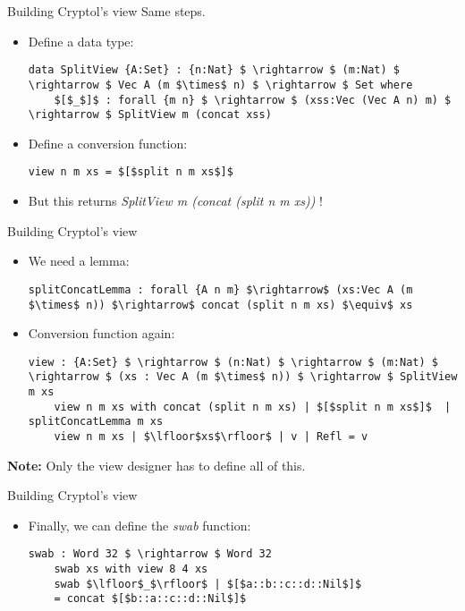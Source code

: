 \documentclass[10pt]{beamer}
\begin{document}
\begin{frame}[fragile]{Building Cryptol's view}
Same steps.
\begin{itemize}
\item Define a data type:
	\begin{lstlisting}[mathescape=true]
	data SplitView {A:Set} : {n:Nat} $ \rightarrow $ (m:Nat) $ \rightarrow $ Vec A (m $\times$ n) $ \rightarrow $ Set where
	$[$_$]$ : forall {m n} $ \rightarrow $ (xss:Vec (Vec A n) m) $ \rightarrow $ SplitView m (concat xss)
	\end{lstlisting}
\item Define a conversion function:
	\begin{lstlisting}[mathescape=true]
	view n m xs = $[$split n m xs$]$
	\end{lstlisting}
\item But this returns \textit{SplitView m (concat (split n m xs))} !
\end{itemize}
\end{frame}

\begin{frame}[fragile]{Building Cryptol's view}
\begin{itemize}
\item We need a lemma:
	\begin{lstlisting}[mathescape=true]
	splitConcatLemma : forall {A n m} $\rightarrow$ (xs:Vec A (m $\times$ n)) $\rightarrow$ concat (split n m xs) $\equiv$ xs
	\end{lstlisting}
\item Conversion function again:
	\begin{lstlisting}[mathescape=true]
	view : {A:Set} $ \rightarrow $ (n:Nat) $ \rightarrow $ (m:Nat) $ \rightarrow $ (xs : Vec A (m $\times$ n)) $ \rightarrow $ SplitView m xs
	view n m xs with concat (split n m xs) | $[$split n m xs$]$  | splitConcatLemma m xs
	view n m xs | $\lfloor$xs$\rfloor$ | v | Refl = v
	\end{lstlisting}
\end{itemize}
\textbf{Note:} Only the view designer has to define all of this.
\end{frame}

\begin{frame}[fragile]{Building Cryptol's view}

\begin{itemize}
\item Finally, we can define the \textit{swab} function:
	\begin{lstlisting}[mathescape=true]
	swab : Word 32 $ \rightarrow $ Word 32
	swab xs with view 8 4 xs
	swab $\lfloor$_$\rfloor$ | $[$a::b::c::d::Nil$]$ 
	= concat $[$b::a::c::d::Nil$]$
	\end{lstlisting}
\end{itemize}

\end{frame}
\end{document}
